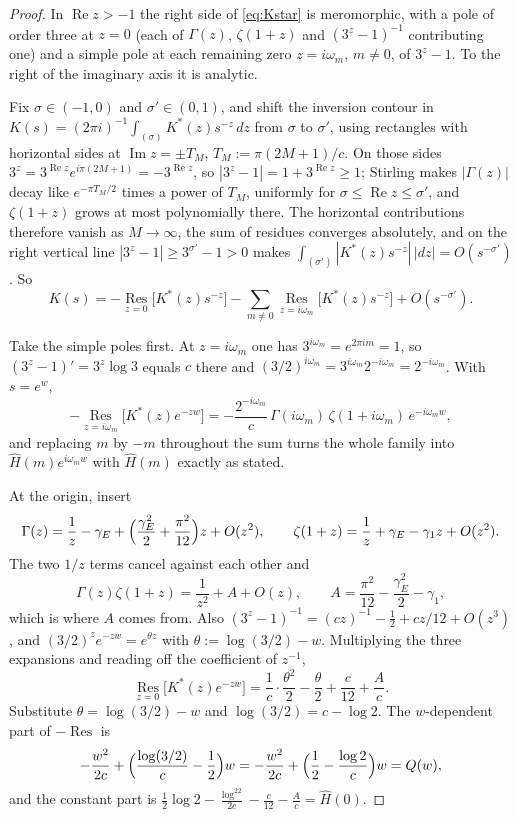 \documentclass[11pt]{amsart}
\theoremstyle{plain}
\theoremstyle{definition}
\theoremstyle{remark}
\begin{document}
\begin{proof}
In $\operatorname{Re}z>-1$ the right side of \eqref{eq:Kstar} is meromorphic, with a pole of order
three at $z=0$ (each of $\Gamma(z)$, $\zeta(1+z)$ and $(3^z-1)^{-1}$ contributing one) and a simple
pole at each remaining zero $z=i\omega_m$, $m\ne0$, of $3^z-1$. To the right of the imaginary axis
it is analytic.

Fix $\sigma\in(-1,0)$ and $\sigma'\in(0,1)$, and shift the inversion contour in
$K(s)=(2\pi i)^{-1}\int_{(\sigma)}K^*(z)s^{-z}\,dz$ from $\sigma$ to $\sigma'$, using rectangles
with horizontal sides at $\operatorname{Im}z=\pm T_M$, $T_M:=\pi(2M+1)/c$. On those sides
$3^z=3^{\operatorname{Re}z}e^{i\pi(2M+1)}=-3^{\operatorname{Re}z}$, so $|3^z-1| =
1+3^{\operatorname{Re}z}\ge1$; Stirling makes $|\Gamma(z)|$ decay like $e^{-\pi T_M/2}$ times a
power of $T_M$, uniformly for $\sigma\le\operatorname{Re}z\le\sigma'$, and $\zeta(1+z)$ grows at
most polynomially there. The horizontal contributions therefore vanish as $M\to\infty$, the sum of
residues converges absolutely, and on the right vertical line $|3^z-1|\ge3^{\sigma'}-1>0$ makes
$\int_{(\sigma')}|K^*(z)s^{-z}|\,|dz| = O(s^{-\sigma'})$. So
\[
K(s) = -\operatorname*{Res}_{z=0}\bigl[K^*(z)s^{-z}\bigr]
-\sum_{m\ne0}\operatorname*{Res}_{z=i\omega_m}\bigl[K^*(z)s^{-z}\bigr]+O(s^{-\sigma'}).
\]

Take the simple poles first. At $z=i\omega_m$ one has $3^{i\omega_m}=e^{2\pi im}=1$, so
$(3^z-1)'=3^z\log3$ equals $c$ there and $(3/2)^{i\omega_m}=3^{i\omega_m}2^{-i\omega_m}=
2^{-i\omega_m}$. With $s=e^w$,
\[
-\operatorname*{Res}_{z=i\omega_m}\bigl[K^*(z)e^{-zw}\bigr]
= -\frac{2^{-i\omega_m}}{c}\,\Gamma(i\omega_m)\,\zeta(1+i\omega_m)\,e^{-i\omega_m w},
\]
and replacing $m$ by $-m$ throughout the sum turns the whole family into $\hat H(m)e^{i\omega_m w}$
with $\hat H(m)$ exactly as stated.

At the origin, insert
\[
\Gamma(z) = \frac1z-\gamma_E+\Bigl(\frac{\gamma_E^2}{2}+\frac{\pi^2}{12}\Bigr)z+O(z^2), \qquad
\zeta(1+z) = \frac1z+\gamma_E-\gamma_1 z+O(z^2).
\]
The two $1/z$ terms cancel against each other and
\[
\Gamma(z)\zeta(1+z) = \frac{1}{z^2}+A+O(z), \qquad A = \frac{\pi^2}{12}-\frac{\gamma_E^2}{2}-\gamma_1,
\]
which is where $A$ comes from. Also $(3^z-1)^{-1} = (cz)^{-1}-\tfrac12+cz/12+O(z^3)$, and
$(3/2)^ze^{-zw}=e^{\theta z}$ with $\theta:=\log(3/2)-w$. Multiplying the three expansions and
reading off the coefficient of $z^{-1}$,
\[
\operatorname*{Res}_{z=0}\bigl[K^*(z)e^{-zw}\bigr]
= \frac1c\cdot\frac{\theta^2}{2}-\frac{\theta}{2}+\frac{c}{12}+\frac{A}{c}.
\]
Substitute $\theta=\log(3/2)-w$ and $\log(3/2)=c-\log2$. The $w$-dependent part of
$-\operatorname{Res}$ is
\[
-\frac{w^2}{2c}+\Bigl(\frac{\log(3/2)}{c}-\frac12\Bigr)w
= -\frac{w^2}{2c}+\Bigl(\frac12-\frac{\log2}{c}\Bigr)w = Q(w),
\]
and the constant part is
$\tfrac12\log2-\tfrac{\log^22}{2c}-\tfrac{c}{12}-\tfrac Ac = \hat H(0)$.


\end{proof}
\end{document}
